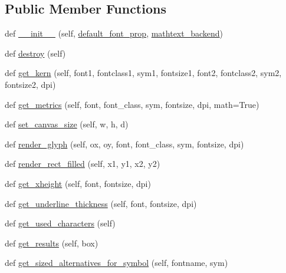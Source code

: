 \subsection*{Public Member Functions}
\begin{DoxyCompactItemize}
\item 
def \hyperlink{classmatplotlib_1_1__mathtext_1_1Fonts_ad54dc7f42b0ee47accb66a4648d2f317}{\+\_\+\+\_\+init\+\_\+\+\_\+} (self, \hyperlink{classmatplotlib_1_1__mathtext_1_1Fonts_a716114e691f32387590085aa0f7128ce}{default\+\_\+font\+\_\+prop}, \hyperlink{classmatplotlib_1_1__mathtext_1_1Fonts_a9742f1a6a11c8cf2ba8b0daddab0acec}{mathtext\+\_\+backend})
\item 
def \hyperlink{classmatplotlib_1_1__mathtext_1_1Fonts_a7caf4da76a13d681f02ace7ed097445d}{destroy} (self)
\item 
def \hyperlink{classmatplotlib_1_1__mathtext_1_1Fonts_a757f73592219d24858ad8f10f88cdd73}{get\+\_\+kern} (self, font1, fontclass1, sym1, fontsize1, font2, fontclass2, sym2, fontsize2, dpi)
\item 
def \hyperlink{classmatplotlib_1_1__mathtext_1_1Fonts_ab792d9a1b3dcd8bf87b2a2ed68c4887e}{get\+\_\+metrics} (self, font, font\+\_\+class, sym, fontsize, dpi, math=True)
\item 
def \hyperlink{classmatplotlib_1_1__mathtext_1_1Fonts_a48ab0f528547f4c009357a4948cfc9c2}{set\+\_\+canvas\+\_\+size} (self, w, h, d)
\item 
def \hyperlink{classmatplotlib_1_1__mathtext_1_1Fonts_aed988318d92997e165675879a068e51b}{render\+\_\+glyph} (self, ox, oy, font, font\+\_\+class, sym, fontsize, dpi)
\item 
def \hyperlink{classmatplotlib_1_1__mathtext_1_1Fonts_a4bf8a7061e25d14ffb02b860df99a558}{render\+\_\+rect\+\_\+filled} (self, x1, y1, x2, y2)
\item 
def \hyperlink{classmatplotlib_1_1__mathtext_1_1Fonts_a24d7cef0a8450b137999c232d78a2c6e}{get\+\_\+xheight} (self, font, fontsize, dpi)
\item 
def \hyperlink{classmatplotlib_1_1__mathtext_1_1Fonts_a221da18a4d54c041734a77d00484b875}{get\+\_\+underline\+\_\+thickness} (self, font, fontsize, dpi)
\item 
def \hyperlink{classmatplotlib_1_1__mathtext_1_1Fonts_a541083e50d7b30cba251107b381a4f36}{get\+\_\+used\+\_\+characters} (self)
\item 
def \hyperlink{classmatplotlib_1_1__mathtext_1_1Fonts_afc8444ade4a0cdd7a891f3761b53d290}{get\+\_\+results} (self, box)
\item 
def \hyperlink{classmatplotlib_1_1__mathtext_1_1Fonts_ac13329029c44c7ea107a297e78db3a8a}{get\+\_\+sized\+\_\+alternatives\+\_\+for\+\_\+symbol} (self, fontname, sym)
\end{DoxyCompactItemize}
